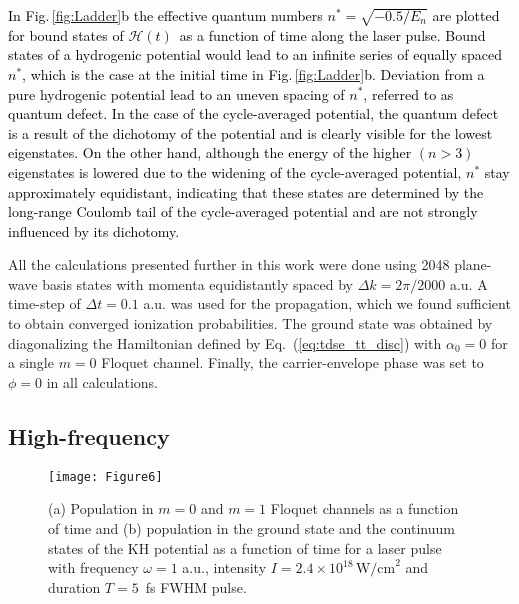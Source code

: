 \documentclass[
pra%
,preprint%
,amssymb, nobibnotes, aps, superscriptaddress, floatfix]{revtex4}
\newcommand{\fig}{Fig.\,}
\newcommand{\as}{\alpha}
\newcommand{\CAHt}{$\mathcal{H}(t)$}
\newcommand{\phase}{\phi}
\newcommand{\dk}{\Delta k}
\newcommand{\editt}[1]{\textcolor{black}{#1}}
\begin{document}
\editt{
In \fig \ref{fig:Ladder}b the effective quantum numbers $n^*=\sqrt{-0.5/E_n}$ are plotted for bound states of \CAHt\ as a function of time along the laser pulse. Bound states of a hydrogenic potential would lead to an infinite series of equally spaced $n^*$, which is the case at the initial time in \fig \ref{fig:Ladder}b. Deviation from a pure hydrogenic potential lead to an uneven spacing of $n^*$, referred to as quantum defect. In the case of the cycle-averaged potential, the quantum defect is a result of the dichotomy of the potential and is clearly visible for the lowest eigenstates. On the other hand, although the energy of the higher $(n>3)$ eigenstates is lowered due to the widening of the cycle-averaged potential, $n^*$ stay approximately equidistant, indicating that these states are determined by the long-range Coulomb tail of the cycle-averaged potential and are not strongly influenced by its dichotomy.}

All the calculations presented further in this work were done using 2048 plane-wave basis states with momenta equidistantly spaced by $\dk = 2\pi / 2000$ a.u. A time-step of $\Delta t = 0.1$ a.u. was used for the propagation, which we found sufficient to obtain converged ionization probabilities. The ground state was obtained by diagonalizing the Hamiltonian defined by Eq.~(\ref{eq:tdse_tt_disc}) with $\as_0=0$ for a single $m=0$ Floquet channel. Finally, the carrier-envelope phase was set to $\phase=0$ in all calculations.

\subsection{High-frequency} \label{sec:high_freq}

\begin{figure*}
	\centering
	\texttt{[image: Figure6]}
	\caption{(a) Population in $m=0$ and $m=1$ Floquet channels as a function of time and
	(b) population in the ground state and the continuum states of the KH potential as a function of time for a laser pulse with frequency $\omega=1$ a.u., intensity $I=2.4 \times 10^{18} \, \text{W/cm}^2$ and duration $T=5$~fs FWHM pulse.}
	\label{fig:KH_and_Floquet_w1_5fs_a10}
\end{figure*}

%
\end{document}
